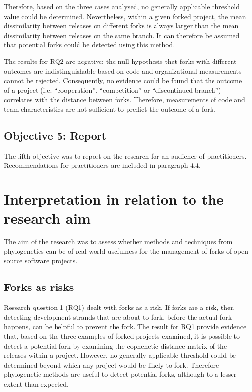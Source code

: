 Therefore, based on the three cases analysed, no generally applicable threshold value could be determined. Nevertheless, within a given forked project, the mean dissimilarity between releases on different forks is always larger than the mean dissimilarity between releases on the same branch. It can therefore be assumed that potential forks could be detected using this method.


The results for RQ2 are negative: the null hypothesis that forks with different outcomes are indistinguishable based on code and organizational measurements cannot be rejected. Consequently, no evidence could be found that the outcome of a project (i.e. “cooperation”, “competition” or “discontinued branch”) correlates with the distance between forks. Therefore, measurements of code and team characteristics are not sufficient to predict the outcome of a fork.

\subsection{Objective 5: Report}
The fifth objective was to report on the research for an audience of practitioners. Recommendations for practitioners are included in paragraph 4.4.


\section{Interpretation in relation to the research aim}
The aim of the research was to assess whether methods and techniques from phylogenetics can be of real-world usefulness for the management of forks of open source software projects. 

\subsection{Forks as risks}
Research question 1 (RQ1) dealt with forks as a risk. If forks are a risk, then detecting development strands that are about to fork, before the actual fork happens, can be helpful to prevent the fork. The result for RQ1 provide evidence that, based on the three examples of forked projects examined, it is possible to detect a potential fork by examining the cophenetic distance matrix of the releases within a project. However, no generally applicable threshold could be determined beyond which any project would be likely to fork. Therefore phylogenetic methods are useful to detect potential forks, although to a lesser extent than expected.

